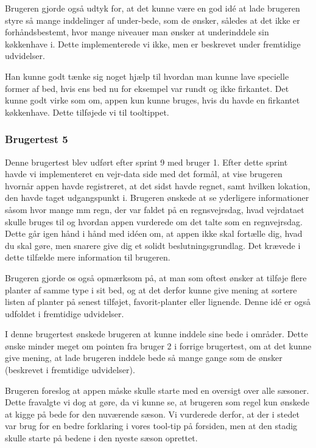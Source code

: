 Brugeren gjorde også udtyk for, at det kunne være en god idé at lade brugeren styre så mange inddelinger af under-bede, som de ønsker, således at det ikke er forhåndsbestemt, hvor mange niveauer man ønsker at underinddele sin køkkenhave i. Dette implementerede vi ikke, men er beskrevet under fremtidige udvidelser.

Han kunne godt tænke sig noget hjælp til hvordan man kunne lave specielle former af bed, hvis ens bed nu for eksempel var rundt og ikke firkantet. Det kunne godt virke som om, appen kun kunne bruges, hvis du havde en firkantet køkkenhave. Dette tilføjede vi til tooltippet.

\subsubsection{Brugertest 5}
Denne brugertest blev udført efter sprint 9 med bruger 1. Efter dette sprint havde vi implementeret en vejr-data side med det formål, at vise brugeren hvornår appen havde registreret, at det sidst havde regnet, samt hvilken lokation, den havde taget udgangspunkt i. Brugeren ønskede at se yderligere informationer såsom hvor mange mm regn, der var faldet på en regnsvejrsdag, hvad vejrdataet skulle bruges til og hvordan appen vurderede om det talte som en regnvejrsdag. Dette går igen hånd i hånd med idéen om, at appen ikke skal fortælle dig, hvad du skal gøre, men snarere give dig et solidt beslutningsgrundlag. Det krævede i dette tilfælde mere information til brugeren.

Brugeren gjorde os også opmærksom på, at man som oftest ønsker at tilføje flere planter af samme type i sit bed, og at det derfor kunne give mening at sortere listen af planter på senest tilføjet, favorit-planter eller lignende. Denne idé er også udfoldet i fremtidige udvidelser.

I denne brugertest ønskede brugeren at kunne inddele sine bede i områder. Dette ønske minder meget om pointen fra bruger 2 i forrige brugertest, om at det kunne give mening, at lade brugeren inddele bede så mange gange som de ønsker (beskrevet i fremtidige udvidelser).

Brugeren foreslog at appen måske skulle starte med en oversigt over alle sæsoner. Dette fravalgte vi dog at gøre, da vi kunne se, at brugeren som regel kun ønskede at kigge på bede for den nuværende sæson. Vi vurderede derfor, at der i stedet var brug for en bedre forklaring i vores tool-tip på forsiden, men at den stadig skulle starte på bedene i den nyeste sæson oprettet.

